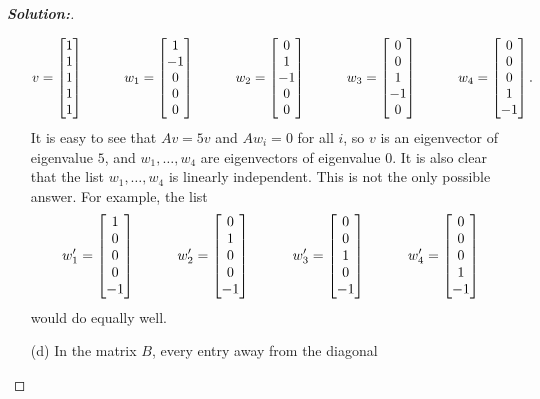 \documentclass[a4paper]{amsart}
\theoremstyle{definition}
\newenvironment{solution}{\begin{proof}[\textbf{Solution:}] \vphantom{u}}{\end{proof}}
\begin{document}
\begin{solution}
\begin{itemize}
   \[ v   = \bbm 1 \\  1 \\  1 \\  1 \\  1 \ebm \hspace{3em}
      w_1 = \bbm 1 \\ -1 \\  0 \\  0 \\  0 \ebm \hspace{3em}
      w_2 = \bbm 0 \\  1 \\ -1 \\  0 \\  0 \ebm \hspace{3em}
      w_3 = \bbm 0 \\  0 \\  1 \\ -1 \\  0 \ebm \hspace{3em}
      w_4 = \bbm 0 \\  0 \\  0 \\  1 \\ -1 \ebm.
   \]
   It is easy to see that $Av=5v$ and $Aw_i=0$ for all $i$, so $v$ is
   an eigenvector of eigenvalue $5$, and $w_1,\dotsc,w_4$ are
   eigenvectors of eigenvalue $0$.  It is also clear that the list 
   $w_1,\dotsc,w_4$ is linearly independent.  This is not the only
   possible answer.  For example, the list 
   \[ w'_1 = \bbm 1 \\  0 \\  0 \\  0 \\ -1 \ebm \hspace{3em}
      w'_2 = \bbm 0 \\  1 \\  0 \\  0 \\ -1 \ebm \hspace{3em}
      w'_3 = \bbm 0 \\  0 \\  1 \\  0 \\ -1 \ebm \hspace{3em}
      w'_4 = \bbm 0 \\  0 \\  0 \\  1 \\ -1 \ebm
   \]
   would do equally well.
  \item[(d)] In the matrix $B$, every entry away from the diagonal

\end{itemize}
\end{solution}
\end{document}
